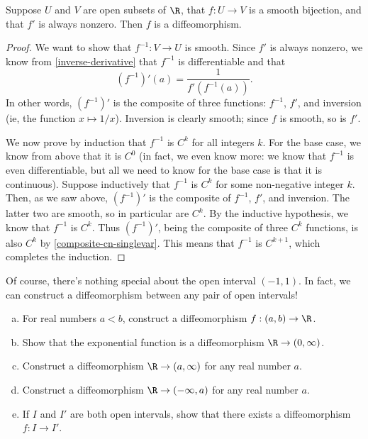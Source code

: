 \begin{lemma} \label{smooth-nonzero-deriv-diffeo-single-var}
	Suppose $U$ and $V$ are open subsets of $\R$, that $f : U \to V$ is a smooth bijection, and that $f'$ is always nonzero. Then $f$ is a diffeomorphism. 
\end{lemma}

\begin{proof}
	We want to show that $f^{-1} : V \to U$ is smooth. Since $f'$ is always nonzero, we know from \cref{inverse-derivative} that $f^{-1}$ is differentiable and that
	\[ (f^{-1})'(a) = \frac{1}{f'(f^{-1}(a))}. \]
	In other words, $(f^{-1})'$ is the composite of three functions: $f^{-1}$, $f'$, and inversion (ie, the function $x \mapsto 1/x$). Inversion is clearly smooth; since $f$ is smooth, so is $f'$. 
	
	We now prove by induction that $f^{-1}$ is $C^k$ for all integers $k$. For the base case, we know from above that it is $C^0$ (in fact, we even know more: we know that $f^{-1}$ is even differentiable, but all we need to know for the base case is that it is continuous). Suppose inductively that $f^{-1}$ is $C^k$ for some non-negative integer $k$. Then, as we saw above, $(f^{-1})'$ is the composite of $f^{-1}$, $f'$, and inversion. The latter two are smooth, so in particular are $C^k$. By the inductive hypothesis, we know that $f^{-1}$ is $C^k$. Thus $(f^{-1})'$, being the composite of three $C^k$ functions, is also $C^k$ by \cref{composite-cn-singlevar}. This means that $f^{-1}$ is $C^{k+1}$, which completes the induction. 
\end{proof}

Of course, there's nothing special about the open interval $(-1,1)$. In fact, we can construct a diffeomorphism between any pair of open intervals!

\begin{exercise} \label{open-intervals-diffeomorphic}
	\begin{enumerate}[(a)]
		\item For real numbers $a < b$, construct a diffeomorphism $f : (a, b) \to \R$.
		\item Show that the exponential function is a diffeomorphism $\R \to (0, \infty)$. 
		\item Construct a diffeomorphism $\R \to (a, \infty)$ for any real number $a$. 
		\item Construct a diffeomorphism $\R \to (-\infty, a)$ for any real number $a$. 
		\item If $I$ and $I'$ are both open intervals, show that there exists a diffeomorphism $f : I \to I'$. 
	\end{enumerate}
\end{exercise}


